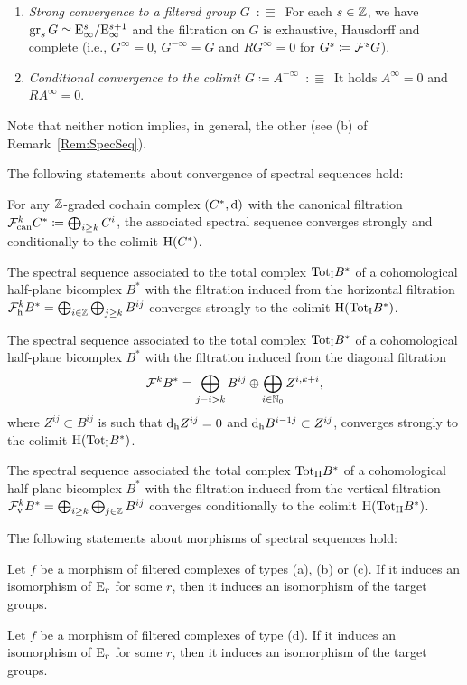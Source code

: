 \documentclass[\MainFolder/Text.tex]{subfiles}
\begin{document}
\begin{enumerate}
\item\emph{Strong convergence to a filtered group $G$}\ $:\Equiv$\ For each $s\in \mathbb{Z}$, we have $\operatorname{\mathrm{gr}}_s G \simeq \mathrm{E}_\infty^s/\mathrm{E}_\infty^{s+1}$ and the filtration on $G$ is exhaustive, Hausdorff and complete (i.e., $G^\infty = 0$, $G^{-\infty} = G$ and $RG^\infty = 0$ for $G^s \coloneqq \mathcal{F}^s G$).
\item\emph{Conditional convergence to the colimit $G\coloneqq A^{-\infty}$}\ $:\Equiv$\ It holds $A^\infty = 0$ and $RA^\infty = 0$.
\end{enumerate}
Note that neither notion implies, in general, the other (see (b) of Remark~\ref{Rem:SpecSeq}).

\begin{Proposition}\label{Prop:ConvOfSpSeq}
The following statements about convergence of spectral sequences hold:
\begin{ClaimList}
\item For any $\mathbb{Z}$-graded cochain complex $(C^*,\mathrm{d})$ with the canonical filtration $\mathcal{F}^k_{{\mathrm{can}}} C^* \coloneqq \bigoplus_{i\ge k} C^i$, the associated spectral sequence converges strongly and conditionally to the colimit $\mathrm{H}(C^*)$.
\item The spectral sequence associated to the total complex ${\mathrm{Tot}_{\mathrm{I}}} B^*$ of a cohomological half-plane bicomplex $B^*$ with the filtration induced from the horizontal filtration $\mathcal{F}^k_{{\mathrm{h}}} B^* = \bigoplus_{i\in\mathbb{Z}}\bigoplus_{j\ge k} B^{ij}$ converges strongly to the colimit $\mathrm{H}({\mathrm{Tot}_{\mathrm{I}}} B^*)$.
\item The spectral sequence associated to the total complex ${\mathrm{Tot}_{\mathrm{I}}} B^*$ of a cohomological half-plane bicomplex $B^{*}$ with the filtration induced from the diagonal filtration 
$$ \mathcal{F}^k B^* = \bigoplus_{j-i>k} B^{ij} \oplus \bigoplus_{i\in \mathbb{N}_0} Z^{i,k+i}, $$
where $Z^{ij} \subset B^{i j}$ is such that $\mathrm{d}_{{\mathrm{h}}} Z^{ij} = 0$ and $\mathrm{d}_{{\mathrm{h}}} B^{i-1 j} \subset Z^{ij}$, converges strongly to the colimit $\mathrm{H}({\mathrm{Tot}_{\mathrm{I}}} B^*)$.
\item The spectral sequence associated the total complex ${\mathrm{Tot}_{\mathrm{II}}} B^*$ of a cohomological half-plane bicomplex $B^{*}$ with the filtration induced from the vertical filtration $\mathcal{F}^k_{{\mathrm{v}}} B^* = \bigoplus_{i\ge k}\bigoplus_{j\in\mathbb{Z}} B^{ij}$ converges conditionally to the colimit $\mathrm{H}({\mathrm{Tot}_{\mathrm{II}}} B^*)$.
\end{ClaimList}
The following statements about morphisms of spectral sequences hold:
\begin{ClaimList}[resume]
\item Let $f$ be a morphism of filtered complexes of types (a), (b) or (c). If it induces an isomorphism of $\mathrm{E}_r$ for some $r$, then it induces an isomorphism of the target groups.
\item Let $f$ be a morphism of filtered complexes of type (d). If it induces an isomorphism of $\mathrm{E}_r$ for some $r$, then it induces an isomorphism of the target groups.
\end{ClaimList}
\end{Proposition}
\end{document}
